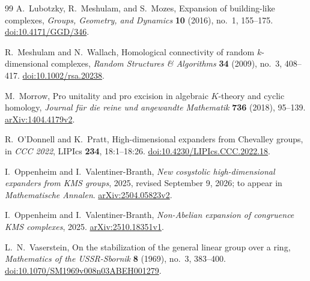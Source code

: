 \begin{thebibliography}{99}
A.~Lubotzky, R.~Meshulam, and S.~Mozes,
Expansion of building-like complexes,
\emph{Groups, Geometry, and Dynamics} \textbf{10} (2016), no.~1, 155--175.
\href{https://doi.org/10.4171/GGD/346}{doi:10.4171/GGD/346}.

R.~Meshulam and N.~Wallach,
Homological connectivity of random $k$-dimensional complexes,
\emph{Random Structures \& Algorithms} \textbf{34} (2009), no.~3, 408--417.
\href{https://doi.org/10.1002/rsa.20238}{doi:10.1002/rsa.20238}.

M.~Morrow,
Pro unitality and pro excision in algebraic $K$-theory and cyclic homology,
\emph{Journal f\"ur die reine und angewandte Mathematik} \textbf{736} (2018), 95--139.
\href{https://arxiv.org/abs/1404.4179v2}{arXiv:1404.4179v2}.

R.~O'Donnell and K.~Pratt,
High-dimensional expanders from Chevalley groups,
in \emph{CCC 2022}, LIPIcs \textbf{234}, 18:1--18:26.
\href{https://doi.org/10.4230/LIPIcs.CCC.2022.18}{doi:10.4230/LIPIcs.CCC.2022.18}.

I.~Oppenheim and I.~Valentiner-Branth,
\emph{New cosystolic high-dimensional expanders from KMS groups},
2025, revised September 9, 2026; to appear in \emph{Mathematische Annalen}.
\href{https://arxiv.org/abs/2504.05823v2}{arXiv:2504.05823v2}.

I.~Oppenheim and I.~Valentiner-Branth,
\emph{Non-Abelian expansion of congruence KMS complexes}, 2025.
\href{https://arxiv.org/abs/2510.18351v1}{arXiv:2510.18351v1}.

L.~N.~Vaserstein,
On the stabilization of the general linear group over a ring,
\emph{Mathematics of the USSR-Sbornik} \textbf{8} (1969), no.~3, 383--400.
\href{https://doi.org/10.1070/SM1969v008n03ABEH001279}{doi:10.1070/SM1969v008n03ABEH001279}.

\end{thebibliography}

